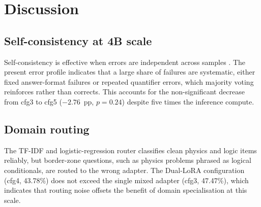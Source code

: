 \documentclass[APA,twocolumn]{USG}
\begin{document}
\section{Discussion}\label{sec7}

\subsection{Self-consistency at 4B scale}
Self-consistency is effective when errors are independent across samples
\citep{Wang2023sc}. The present error profile indicates that a large share of
failures are systematic, either fixed answer-format failures or repeated
quantifier errors, which majority voting reinforces rather than corrects. This
accounts for the non-significant decrease from cfg3 to cfg5
($-2.76$~pp, $p=0.24$) despite five times the inference compute.

\subsection{Domain routing}
The TF-IDF and logistic-regression router classifies clean physics and logic
items reliably, but border-zone questions, such as physics problems phrased as
logical conditionals, are routed to the wrong adapter. The Dual-LoRA
configuration (cfg4, 43.78\%) does not exceed the single mixed adapter
(cfg3, 47.47\%), which indicates that routing noise offsets the benefit of
domain specialisation at this scale.
\end{document}
